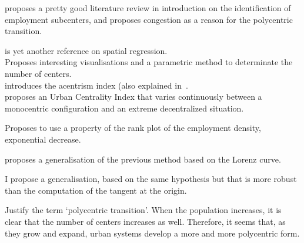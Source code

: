 \cite{McMillen:2003} proposes a pretty good literature review in introduction on
the identification of employment subcenters, and proposes congestion as a reason
for the polycentric transition.


\cite{Griffith:2007} is yet another reference on spatial regression.\\

\cite{Redfearn:2007} Proposes interesting visualisations and a parametric method
to determinate the number of centers.\\

\cite{LeNechet:2010} introduces the acentrism index (also explained
in~\cite{LeNechet:2015}.\\

\cite{Pereira:2013} proposes an Urban Centrality Index that varies continuously
between a monocentric configuration and an extreme decentralized situation.

\cite{Louf:2013_polycentric} Proposes to use a property of the rank plot of the
employment density, exponential decrease.

\cite{Louail:2014} proposes a generalisation of the previous method based on the
Lorenz curve.

I propose a generalisation, based on the same hypothesis but that is more robust
than the computation of the tangent at the origin.

Justify the term `polycentric transition'. When the population increases, it is
clear that the number of centers increases as well. Therefore, it seems that, as
they grow and expand, urban systems develop a more and more polycentric form.
